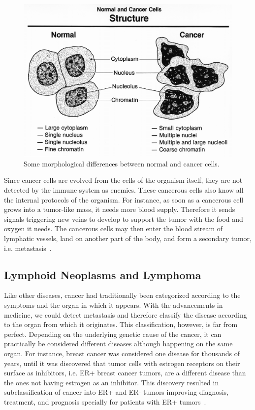 \begin{figure}[!ht]
  \centering
  \includegraphics[width=.8\textwidth]{figs/background/Normal_and_cancer_cells_structure}
  \caption{Some morphological differences between normal and cancer cells.}
  \label{fig:bkg:normal-cancer}
\end{figure}

Since cancer cells are evolved from the cells of the organism itself, they are not detected by the immune system as enemies. These cancerous cells also know all the internal protocols of the organism. For instance, as soon as a cancerous cell grows into a tumor-like mass, it needs more blood supply. Therefore it sends signals triggering new veins to develop to support the tumor with the food and oxygen it needs. The cancerous cells may then enter the blood stream of lymphatic vessels, land on another part of the body, and form a secondary tumor, i.e. metastasis~\cite[Ch. 20]{the-cell}.

\subsection{Lymphoid Neoplasms and Lymphoma}
Like other diseases, cancer had traditionally been categorized according to the symptoms and the organ in which it appears. With the advancements in medicine, we could detect metastasis and therefore classify the disease according to the organ from which it originates. This classification, however, is far from perfect. Depending on the underlying genetic cause of the cancer, it can practically be considered different diseases although happening on the same organ. For instance, breast cancer was considered one disease for thousands of years, until it was discovered that tumor cells with estrogen receptors on their surface as inhibitors, i.e. ER+ breast cancer tumors, are a different disease than the ones not having estrogen as an inhibitor. This discovery resulted in subclassification of cancer into ER+ and ER- tumors improving diagnosis, treatment, and prognosis specially for patients with ER+ tumors~\cite{the-emperor-of-all-maladies}.

